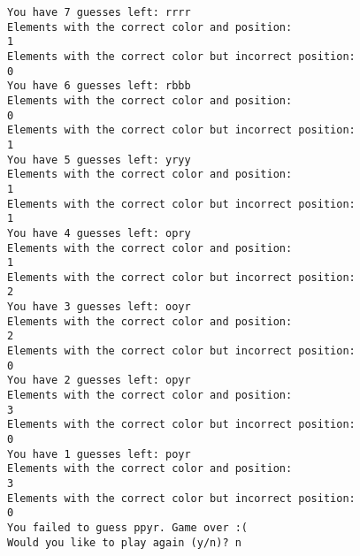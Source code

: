 \begin{verbatim}
You have 7 guesses left: rrrr
Elements with the correct color and position:                                  1
Elements with the correct color but incorrect position:                        0
You have 6 guesses left: rbbb
Elements with the correct color and position:                                  0
Elements with the correct color but incorrect position:                        1
You have 5 guesses left: yryy
Elements with the correct color and position:                                  1
Elements with the correct color but incorrect position:                        1
You have 4 guesses left: opry
Elements with the correct color and position:                                  1
Elements with the correct color but incorrect position:                        2
You have 3 guesses left: ooyr
Elements with the correct color and position:                                  2
Elements with the correct color but incorrect position:                        0
You have 2 guesses left: opyr
Elements with the correct color and position:                                  3
Elements with the correct color but incorrect position:                        0
You have 1 guesses left: poyr
Elements with the correct color and position:                                  3
Elements with the correct color but incorrect position:                        0
You failed to guess ppyr. Game over :(
Would you like to play again (y/n)? n
\end{verbatim}
